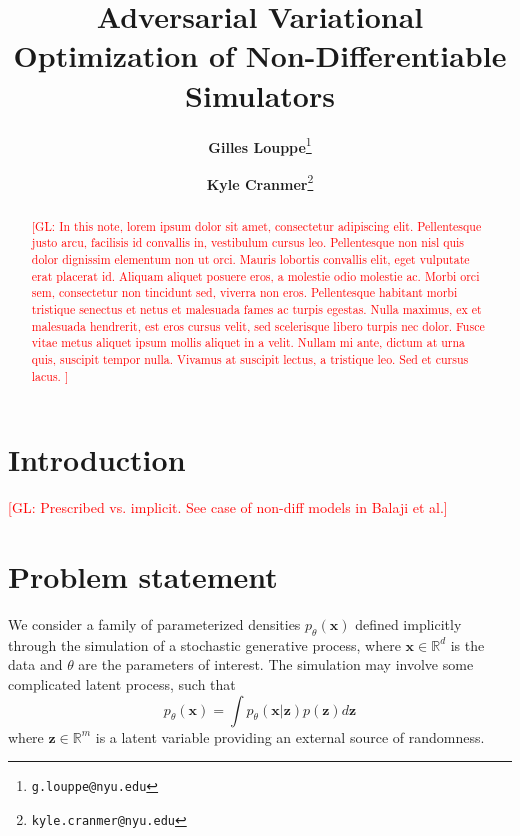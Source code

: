 \documentclass[twocolumn,superscriptaddress,aps]{revtex4-1}
\newcommand{\glnote}[1]{\textcolor{red}{[GL: #1]}}
\theoremstyle{plain}
\begin{document}

\title{\Large{Adversarial Variational Optimization of Non-Differentiable Simulators}}
\vspace{1cm}
\author{\small{\bf Gilles Louppe}\thanks{\texttt{g.louppe@nyu.edu}}}
\author{\small{\bf Kyle Cranmer}\thanks{\texttt{kyle.cranmer@nyu.edu}}}

\begin{abstract}

\glnote{
In this note, lorem ipsum dolor sit amet, consectetur adipiscing elit. Pellentesque justo arcu, facilisis id convallis in, vestibulum cursus leo. Pellentesque non nisl quis dolor dignissim elementum non ut orci. Mauris lobortis convallis elit, eget vulputate erat placerat id. Aliquam aliquet posuere eros, a molestie odio molestie ac. Morbi orci sem, consectetur non tincidunt sed, viverra non eros. Pellentesque habitant morbi tristique senectus et netus et malesuada fames ac turpis egestas. Nulla maximus, ex et malesuada hendrerit, est eros cursus velit, sed scelerisque libero turpis nec dolor. Fusce vitae metus aliquet ipsum mollis aliquet in a velit. Nullam mi ante, dictum at urna quis, suscipit tempor nulla. Vivamus at suscipit lectus, a tristique leo. Sed et cursus lacus.
}

\end{abstract}

\maketitle


\section{Introduction}

\glnote{Prescribed vs. implicit. See case of non-diff models in Balaji et al.}



\section{Problem statement}
\label{sec:problem}

We consider a family of parameterized densities $p_\theta(\mathbf{x})$
defined implicitly through the simulation of a stochastic generative process,
where $\mathbf{x} \in \mathbb{R}^d$ is the data and $\theta$ are the
parameters of interest. The simulation may involve some complicated latent
process, such that
\begin{equation}\label{eqn:p_x}
    p_\theta(\mathbf{x}) = \int p_\theta(\mathbf{x}|\mathbf{z}) p(\mathbf{z}) d\mathbf{z}
\end{equation}
where $\mathbf{z} \in \mathbb{R}^m$ is a latent variable providing an external source
of randomness.
\end{document}
